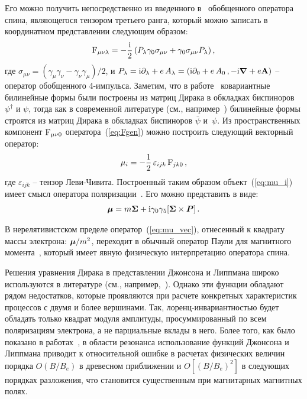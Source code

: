Его можно получить непосредственно 
из введенного в~\cite{Sokolov:1968} обобщенного оператора спина, 
являющегося тензором третьего ранга, который можно записать в координатном представлении следующим образом:
%
\begin{eqnarray}
	{\rm F}_{\mu \nu \lambda} = - \frac{\mathrm{i}}{2} \left( P_\lambda \gamma_0 \sigma_{\mu \nu} 
	+ \gamma_0 \sigma_{\mu \nu} P_\lambda \right),
	\label{eq:Fgen}
\end{eqnarray}
%
\noindent где $\sigma_{\mu \nu} = (\gamma_\mu \gamma_\nu - \gamma_\nu \gamma_\mu)/2$, и  
$P_\lambda = \mathrm{i} \partial_\lambda +e \, A_\lambda = \left( \mathrm{i} \partial_0 +e \, A_0 \,, 
- \mathrm{i} {\boldsymbol \nabla} +e {\bf A} \right)$ -- оператор обобщенного 4-импульса. 
Заметим, что в работе~\cite{Sokolov:1968} ковариантные билинейные формы были построены из матриц Дирака в обкладках  биспиноров 
$\psi^{\dagger}$ и $\psi$, тогда как в современной литературе (см., например~\cite{Peskin:1995}) билинейные формы строятся из матриц 
Дирака в обкладках биспиноров $\bar\psi$ и~$\psi$. Из пространственных компонент ${\rm F}_{\mu \nu 0}$ 
оператора~(\ref{eq:Fgen}) можно построить следующий векторный оператор:
%
\begin{eqnarray}
	\mu_i = - \frac{1}{2} \, \varepsilon_{ijk} \, {\rm F}_{jk0} \,, 
	\label{eq:mu_i}
\end{eqnarray}
%
где $\varepsilon_{ijk}$ -- тензор Леви-Чивита.  
Построенный таким образом объект~(\ref{eq:mu_i})  имеет смысл 
оператора поляризации~\cite{Sokolov:1968,Melrose:1983}.
Его можно представить в виде:
%
\begin{eqnarray}
	{\boldsymbol\mu} = m {\boldsymbol \Sigma} + \mathrm{i} \gamma_0 \gamma_5 [{\boldsymbol \Sigma} \times 
	{\boldsymbol P}] \, .
	\label{eq:mu_vec}
\end{eqnarray}

В нерелятивистском пределе оператор~(\ref{eq:mu_vec}), 
отнесенный к квадрату массы электрона:  ${\boldsymbol \mu}/m^2$,  
переходит в обычный оператор Паули для магнитного момента~\cite{Landau:1989}, 
который имеет явную физическую интерпретацию оператора спина.

Решения уравнения Дирака в представлении Джонсона и Липпмана широко используются в литературе (см., например,~\cite{Canuto:1975,Harding:1991,Suh:1999,Gonthier:2000,Jones:2010,Melrose:2020}). Однако эти функции обладают рядом недостатков, которые проявляются при расчете конкретных характеристик процессов с двумя и более вершинами. Так, лоренц-инвариантностью будет обладать только квадрат модуля амплитуды, просуммированный по всем поляризациям электрона, а не парциальные вклады в него. Более того, как было показано в работах~\cite{Graziani:1993,Gonthier:2014}, в области резонанса использование функций Джонсона и Липпмана приводит к относительной ошибке в расчетах физических величин порядка $O(B / B_{e})$ в древесном приближении и $O[(B / B_{e})^2]$ в следующих порядках разложения, что становится существенным при магнитарных магнитных полях.

